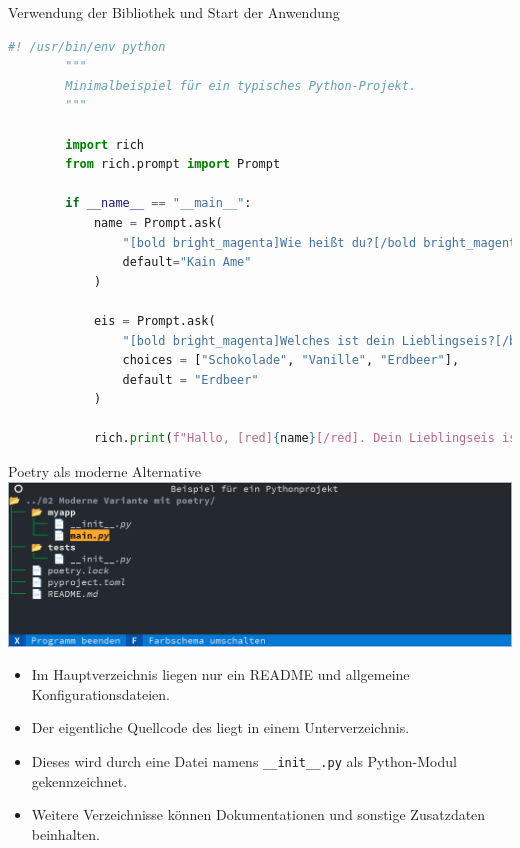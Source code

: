 {{\begin{frame}[fragile]{Verwendung der Bibliothek und Start der Anwendung}
    \begin{lstlisting}[language=Python, gobble=8]
        #! /usr/bin/env python
        """
        Minimalbeispiel für ein typisches Python-Projekt.
        """

        import rich
        from rich.prompt import Prompt

        if __name__ == "__main__":
            name = Prompt.ask(
                "[bold bright_magenta]Wie heißt du?[/bold bright_magenta]",
                default="Kain Ame"
            )

            eis = Prompt.ask(
                "[bold bright_magenta]Welches ist dein Lieblingseis?[/bold bright_magenta]",
                choices = ["Schokolade", "Vanille", "Erdbeer"],
                default = "Erdbeer"
            )

            rich.print(f"Hallo, [red]{name}[/red]. Dein Lieblingseis ist [blue]{eis}[/blue]. :red_heart-emoji:\n")
    \end{lstlisting}
\end{frame}
}

{
\tiny

\begin{frame}{Poetry als moderne Alternative}
    \includegraphics[width=\textwidth]{img/verzeichnisse-poetry}
    \smallskip


    \begin{itemize}
        \item Im Hauptverzeichnis liegen nur ein README und allgemeine Konfigurationsdateien.
        \item Der eigentliche Quellcode des liegt in einem Unterverzeichnis.
        \item Dieses wird durch eine Datei namens \texttt{\_\_init\_\_.py} als Python-Modul gekennzeichnet.
        \item Weitere Verzeichnisse können Dokumentationen und sonstige Zusatzdaten beinhalten.
    \end{itemize}


\end{frame}}}
